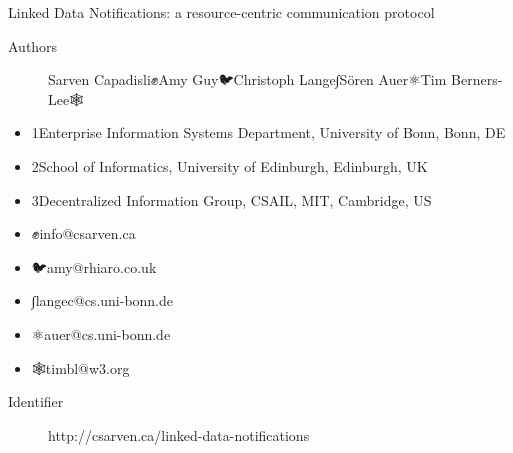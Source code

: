 
  
  
        
            
                Linked Data Notifications: a resource-centric communication protocol

                
                    \begin{description}
  \item[Authors] \empty Sarven Capadisli\empty ✊\empty Amy Guy\empty 🐦\empty Christoph Lange\empty ∫\empty Sören Auer\empty ⚛\empty Tim Berners-Lee\empty 🕸
    \end{description}
  

                    \begin{itemize}
  \item 1Enterprise Information Systems Department, \empty University of Bonn, Bonn, DE\item 2School of Informatics, \empty University of Edinburgh, Edinburgh, UK\item 3Decentralized Information Group, CSAIL, \empty MIT, Cambridge, US
    \end{itemize}
  

                    \begin{itemize}
  \item ✊\empty info@csarven.ca\item 🐦\empty amy@rhiaro.co.uk\item ∫\empty langec@cs.uni-bonn.de\item ⚛\empty auer@cs.uni-bonn.de\item 🕸\empty timbl@w3.org
    \end{itemize}
  
                

                \begin{description}
  \item[Identifier] \empty http://csarven.ca/linked-data-notifications
    \end{description}
  

                
                    
                        
                        
